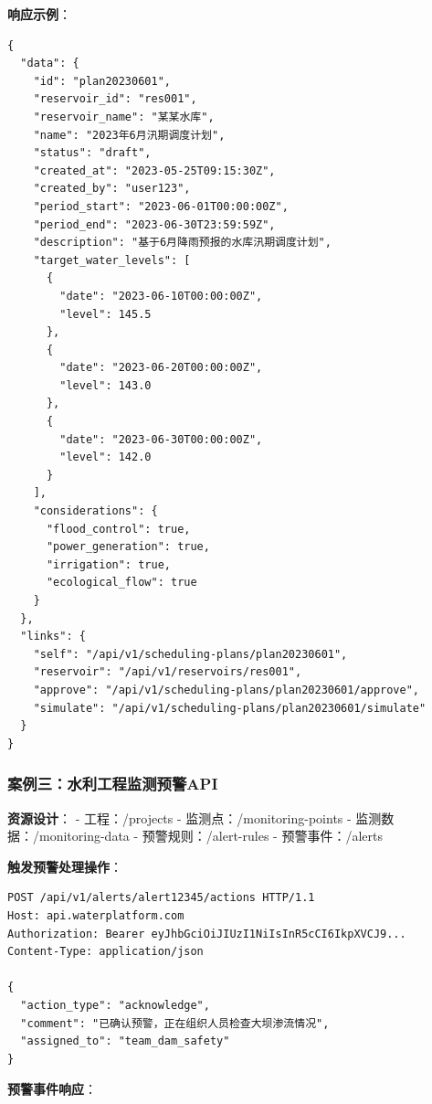 \textbf{响应示例}：

\begin{lstlisting}
{
  "data": {
    "id": "plan20230601",
    "reservoir_id": "res001",
    "reservoir_name": "某某水库",
    "name": "2023年6月汛期调度计划",
    "status": "draft",
    "created_at": "2023-05-25T09:15:30Z",
    "created_by": "user123",
    "period_start": "2023-06-01T00:00:00Z",
    "period_end": "2023-06-30T23:59:59Z",
    "description": "基于6月降雨预报的水库汛期调度计划",
    "target_water_levels": [
      {
        "date": "2023-06-10T00:00:00Z",
        "level": 145.5
      },
      {
        "date": "2023-06-20T00:00:00Z",
        "level": 143.0
      },
      {
        "date": "2023-06-30T00:00:00Z",
        "level": 142.0
      }
    ],
    "considerations": {
      "flood_control": true,
      "power_generation": true,
      "irrigation": true,
      "ecological_flow": true
    }
  },
  "links": {
    "self": "/api/v1/scheduling-plans/plan20230601",
    "reservoir": "/api/v1/reservoirs/res001",
    "approve": "/api/v1/scheduling-plans/plan20230601/approve",
    "simulate": "/api/v1/scheduling-plans/plan20230601/simulate"
  }
}
\end{lstlisting}

\subsubsection{案例三：水利工程监测预警API}\label{ux6848ux4f8bux4e09ux6c34ux5229ux5de5ux7a0bux76d1ux6d4bux9884ux8b66api}

\textbf{资源设计}： - 工程：/projects - 监测点：/monitoring-points -
监测数据：/monitoring-data - 预警规则：/alert-rules - 预警事件：/alerts

\textbf{触发预警处理操作}：

\begin{lstlisting}
POST /api/v1/alerts/alert12345/actions HTTP/1.1
Host: api.waterplatform.com
Authorization: Bearer eyJhbGciOiJIUzI1NiIsInR5cCI6IkpXVCJ9...
Content-Type: application/json

{
  "action_type": "acknowledge",
  "comment": "已确认预警，正在组织人员检查大坝渗流情况",
  "assigned_to": "team_dam_safety"
}
\end{lstlisting}

\textbf{预警事件响应}：

